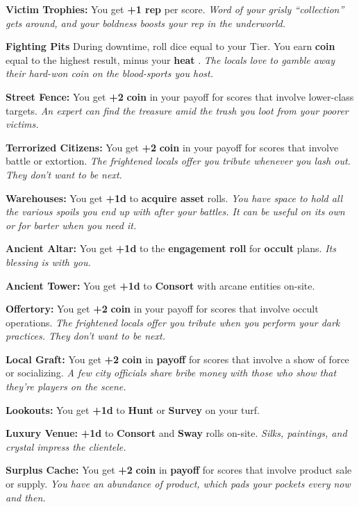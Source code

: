 \documentclass[11pt,fleqn,a5paper]{book}
\newcommand{\gameterm}[1]{\textbf{#1}}
\begin{document}
\gameterm{Victim Trophies:}  You get \textbf{+1 rep} per score. \emph{Word of your grisly “collection” gets around, and your boldness boosts your rep in the underworld.}

\gameterm{Fighting Pits }  During downtime, roll dice equal to your Tier. You earn \gameterm{coin}  equal to the highest result, minus your \gameterm{heat} . \emph{The locals love to gamble away their hard-won coin on the blood-sports you host.}

\gameterm{Street Fence:}  You get \textbf{+2} \gameterm{coin}  in your payoff for scores that involve lower-class targets. \emph{An expert can find the treasure amid the trash you loot from your poorer victims.}

\gameterm{Terrorized Citizens:}  You get \textbf{+2} \gameterm{coin}  in your payoff for scores that involve battle or extortion. \emph{The frightened locals offer you tribute whenever you lash out. They don’t want to be next.}

\gameterm{Warehouses:}  You get \textbf{+1d} to \textbf{acquire asset} rolls. \emph{You have space to hold all the various spoils you end up with after your battles. It can be useful on its own or for barter when you need it.}

\gameterm{Ancient Altar: }  You get \textbf{+1d} to the \textbf{engagement roll} for \textbf{occult} plans. \emph{Its blessing is with you.}

\gameterm{Ancient Tower:}  You get \textbf{+1d} to \gameterm{Consort}  with arcane entities on-site.

\gameterm{Offertory:}  You get \textbf{+2} \gameterm{coin}  in your payoff for scores that involve occult operations. \emph{The frightened locals offer you tribute when you perform your dark practices. They don’t want to be next.}

\gameterm{Local Graft:}  You get \textbf{+2} \gameterm{coin}  in \textbf{payoff} for scores that involve a show of force or socializing. \emph{A few city officials share bribe money with those who show that they’re players on the scene.}

\gameterm{Lookouts: }  You get \textbf{+1d} to \gameterm{Hunt}  or \gameterm{Survey}  on your turf.

\gameterm{Luxury Venue: }  \textbf{+1d} to \gameterm{Consort}  and \gameterm{Sway}  rolls on-site. \emph{Silks, paintings, and crystal impress the clientele.}

\gameterm{Surplus Cache:}  You get \textbf{+2} \gameterm{coin}  in \textbf{payoff} for scores that involve product sale or supply. \emph{You have an abundance of product, which pads your pockets every now and then.}
\end{document}
